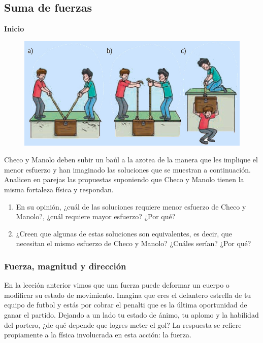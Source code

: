 \documentclass[11pt]{book}
\begin{document}
\subsection{Suma de fuerzas}
\begin{boxK}
  \begin{center}\bfseries\color{colorrds}\large Inicio\end{center}
  \begin{figure}[H]
    \centering
    \includegraphics[width=0.8\linewidth]{subir.jpg}
  \end{figure}%
  Checo y Manolo deben subir un baúl a la azotea de la manera que les implique el menor esfuerzo
  y han imaginado las soluciones que se muestran a continuación.
  Analicen en parejas las propuestas suponiendo que Checo y Manolo tienen la misma fortaleza
  física y respondan.
  \begin{enumerate}
    \item En su opinión, ¿cuál de las soluciones requiere menor esfuerzo de Checo y Manolo?,
          ¿cuál requiere mayor esfuerzo? ¿Por qué?
    \item ¿Creen que algunas de estas soluciones son equivalentes, es decir, que necesitan el
          mismo esfuerzo de Checo y Manolo? ¿Cuáles serían? ¿Por qué?
  \end{enumerate}
\end{boxK}

\subsubsection{Fuerza, magnitud y dirección}
En la lección anterior vimos que una fuerza puede deformar un cuerpo o modificar su estado de
movimiento. Imagina que eres el delantero estrella de tu equipo de futbol y estás por cobrar
el penalti que es la última oportunidad de ganar el partido. Dejando a un lado tu estado de
ánimo, tu aplomo y la habilidad del portero, ¿de qué depende que logres meter el gol?
La respuesta se refiere propiamente a la física involucrada en esta acción: la fuerza.
\end{document}

